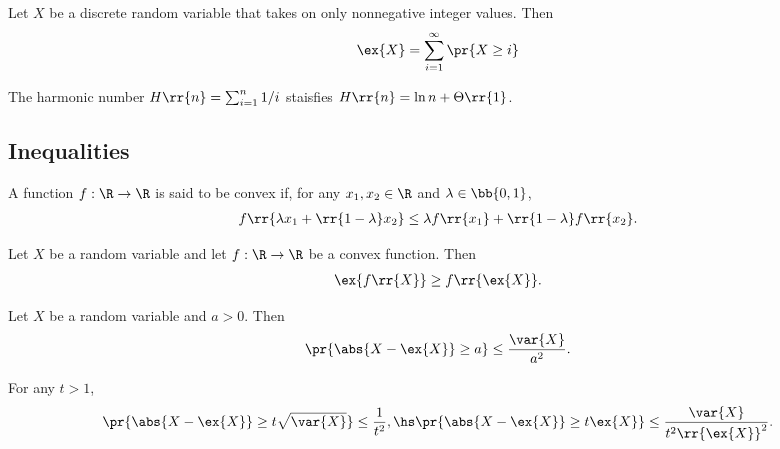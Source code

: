 \documentclass{article}
\begin{document}
\begin{lemma}
  Let $X$ be a discrete random variable that takes on only nonnegative integer values. Then
  \begin{align*}
    \ex{X} = \sum_{i=1}^{\infty} \pr{X\geq i}
  \end{align*}
\end{lemma}

\begin{lemma}
  The harmonic number $H\rr{n}=\sum_{i=1}^{n} 1/i$ staisfies $H\rr{n}=\ln n+\Theta\rr{1}$.
\end{lemma}

\subsection{Inequalities}

\begin{definition}
  \label{def:convex}
  A function $f:\R\to\R$ is said to be convex if, for any $x_1,x_2\in\R$
  and $\lambda\in\bb{0,1}$,
  \begin{align*}
    f\rr{\lambda x_1 + \rr{1-\lambda}x_2} \leq \lambda f\rr{x_1} + \rr{1-\lambda}f \rr{x_2}.
  \end{align*}
\end{definition}

\begin{theorem}
  \label{thm:jensens}
  Let $X$ be a random variable and let $f:\R\to\R$ be a convex function. Then
  \begin{align*}
    \ex{f\rr{X}} \geq f\rr{\ex{X}}.
  \end{align*}
\end{theorem}

\begin{theorem}
  Let $X$ be a random variable and $a>0$. Then
  \begin{align*}
    \pr{\abs{X-\ex{X}}\geq a}\leq \frac{\var{X}}{a^2}.
  \end{align*}
\end{theorem}

\begin{corollary}
  For any $t>1$,
  \begin{align*}
    \pr{\abs{X-\ex{X}}\geq t\sqrt{\var{X}}}\leq \frac{1}{t^2}, \hs
    \pr{\abs{X-\ex{X}}\geq t\ex{X}}\leq \frac{\var{X}}{t^2\rr{\ex{X}}^2}.
  \end{align*}
\end{corollary}
\end{document}
